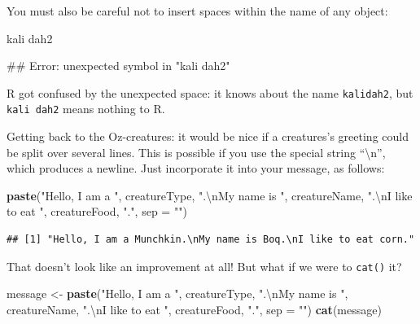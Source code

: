 \documentclass[]{book}
\makeatletter
\newenvironment{Shaded}{\begin{snugshade}}{\end{snugshade}}
\newcommand{\KeywordTok}[1]{\textcolor[rgb]{0.13,0.29,0.53}{\textbf{{#1}}}}
\newcommand{\DataTypeTok}[1]{\textcolor[rgb]{0.13,0.29,0.53}{{#1}}}
\newcommand{\CharTok}[1]{\textcolor[rgb]{0.31,0.60,0.02}{{#1}}}
\newcommand{\StringTok}[1]{\textcolor[rgb]{0.31,0.60,0.02}{{#1}}}
\newcommand{\NormalTok}[1]{{#1}}
\newenvironment{kframe}{%
\medskip{}
\setlength{\fboxsep}{.8em}
 \def\at@end@of@kframe{}%
 \ifinner\ifhmode%
  \def\at@end@of@kframe{\end{minipage}}%
  \begin{minipage}{\columnwidth}%
 \fi\fi%
 \def\FrameCommand##1{\hskip\@totalleftmargin \hskip-\fboxsep
 \colorbox{shadecolor}{##1}\hskip-\fboxsep
     \hskip-\linewidth \hskip-\@totalleftmargin \hskip\columnwidth}%
 \MakeFramed {\advance\hsize-\width
   \@totalleftmargin\z@ \linewidth\hsize
   \@setminipage}}%
 {\par\unskip\endMakeFramed%
 \at@end@of@kframe}
\renewenvironment{Shaded}{\begin{kframe}}{\end{kframe}}
\theoremstyle{definition}
\theoremstyle{definition}
\theoremstyle{remark}
\makeatother
\begin{document}
You must also be careful not to insert spaces within the name of any
object:

\begin{Shaded}
\begin{Highlighting}[]
\NormalTok{kali dah2}
\end{Highlighting}
\end{Shaded}

\begin{Shaded}
\begin{Highlighting}[]
\NormalTok{## Error: unexpected symbol in "kali dah2"}
\end{Highlighting}
\end{Shaded}

R got confused by the unexpected space: it knows about the name
\texttt{kalidah2}, but \texttt{kali\ dah2} means nothing to R.

Getting back to the Oz-creatures: it would be nice if a creatures's
greeting could be split over several lines. This is possible if you use
the special string ``\textbackslash{}n'', which produces a newline. Just
incorporate it into your message, as follows:

\begin{Shaded}
\begin{Highlighting}[]
\KeywordTok{paste}\NormalTok{(}\StringTok{"Hello, I am a "}\NormalTok{,}
      \NormalTok{creatureType,}
      \StringTok{".}\CharTok{\textbackslash{}n}\StringTok{My name is "}\NormalTok{,}
      \NormalTok{creatureName,}
      \StringTok{".}\CharTok{\textbackslash{}n}\StringTok{I like to eat "}\NormalTok{,}
      \NormalTok{creatureFood,}
      \StringTok{"."}\NormalTok{,}
      \DataTypeTok{sep =} \StringTok{""}\NormalTok{)}
\end{Highlighting}
\end{Shaded}

\begin{verbatim}
## [1] "Hello, I am a Munchkin.\nMy name is Boq.\nI like to eat corn."
\end{verbatim}

That doesn't look like an improvement at all! But what if we were to
\texttt{cat()} it?

\begin{Shaded}
\begin{Highlighting}[]
\NormalTok{message <-}\StringTok{ }\KeywordTok{paste}\NormalTok{(}\StringTok{"Hello, I am a "}\NormalTok{,}
                 \NormalTok{creatureType,}
                 \StringTok{".}\CharTok{\textbackslash{}n}\StringTok{My name is "}\NormalTok{,}
                 \NormalTok{creatureName,}
                 \StringTok{".}\CharTok{\textbackslash{}n}\StringTok{I like to eat "}\NormalTok{,}
                 \NormalTok{creatureFood,}
                 \StringTok{"."}\NormalTok{,}
                 \DataTypeTok{sep =} \StringTok{""}\NormalTok{)}
\KeywordTok{cat}\NormalTok{(message)}
\end{Highlighting}
\end{Shaded}
\end{document}
